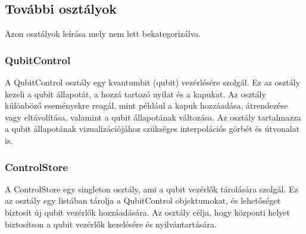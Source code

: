 \documentclass[fontsize=12pt,a4paper]{article}
\begin{document}
\newpage
\subsection{További osztályok}

Azon osztályok leírása mely nem lett bekategorizálva.

\subsubsection{QubitControl}

A QubitControl osztály egy kvantumbit (qubit) vezérlésére szolgál. Ez az osztály kezeli a qubit állapotát, a hozzá tartozó nyilat és a kapukat. Az osztály különböző eseményekre reagál, mint például a kapuk hozzáadása, átrendezése vagy eltávolítása, valamint a qubit állapotának változása. Az osztály tartalmazza a qubit állapotának vizualizációjához szükséges interpolációs görbét és útvonalat is.

\begin{table}[h!]
    \centering
\end{table}

\subsubsection{ControlStore}

A ControlStore egy singleton osztály, ami a qubit vezérlők tárolására szolgál. Ez az osztály egy listában tárolja a QubitControl objektumokat, és lehetőséget biztosít új qubit vezérlők hozzáadására. Az osztály célja, hogy központi helyet biztosítson a qubit vezérlők kezelésére és nyilvántartására.

\begin{table}[h]
    \centering
\end{table}
\end{document}
